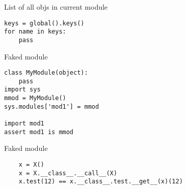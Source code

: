 \documentclass{article}
\begin{document}
\begin{center} List of all objs in current module \end{center}
\begin{lstlisting}
keys = global().keys()
for name in keys:
    pass
\end{lstlisting}

\begin{center} Faked module \end{center}
\begin{lstlisting}
class MyModule(object):
    pass
import sys
mmod = MyModule()
sys.modules['mod1'] = mmod

import mod1
assert mod1 is mmod
\end{lstlisting}

\begin{center} Faked module \end{center}
\begin{lstlisting}
    x = X()
    x = X.__class__.__call__(X)
    x.test(12) == x.__class__.test.__get__(x)(12)
\end{lstlisting}
\end{document}
